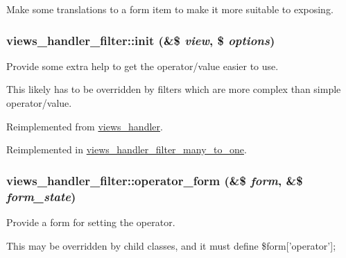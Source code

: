 Make some translations to a form item to make it more suitable to exposing. \hypertarget{classviews__handler__filter_8bae65467710eb5f6cf6c2c46bd51c7b}{
\subsubsection[{init}]{\setlength{\rightskip}{0pt plus 5cm}views\_\-handler\_\-filter::init (\&\$ {\em view}, \/  \$ {\em options})}}
\label{classviews__handler__filter_8bae65467710eb5f6cf6c2c46bd51c7b}


Provide some extra help to get the operator/value easier to use.

This likely has to be overridden by filters which are more complex than simple operator/value. 

Reimplemented from \hyperlink{classviews__handler_1f5f42ba46d3584280788fda97eee8c5}{views\_\-handler}.

Reimplemented in \hyperlink{classviews__handler__filter__many__to__one_8417192dd11eaf273b05cbbc47990cbe}{views\_\-handler\_\-filter\_\-many\_\-to\_\-one}.\hypertarget{classviews__handler__filter_8c77c0a8bba8c3ceceae8950fc7b1121}{
\subsubsection[{operator\_\-form}]{\setlength{\rightskip}{0pt plus 5cm}views\_\-handler\_\-filter::operator\_\-form (\&\$ {\em form}, \/  \&\$ {\em form\_\-state})}}
\label{classviews__handler__filter_8c77c0a8bba8c3ceceae8950fc7b1121}


Provide a form for setting the operator.

This may be overridden by child classes, and it must define \$form\mbox{[}'operator'\mbox{]}; 

